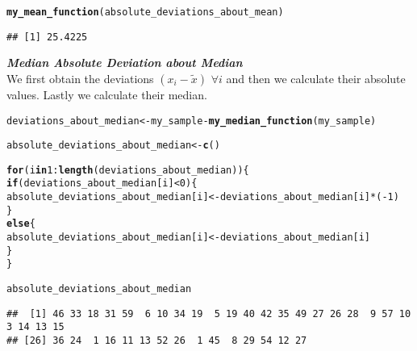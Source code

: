 \documentclass[11pt, a4paper]{article}\usepackage[]{graphicx}\usepackage[]{xcolor}
\makeatletter
\newcommand{\hlnum}[1]{\textcolor[rgb]{0.686,0.059,0.569}{#1}}%
\newcommand{\hlopt}[1]{\textcolor[rgb]{0,0,0}{#1}}%
\newcommand{\hldef}[1]{\textcolor[rgb]{0.345,0.345,0.345}{#1}}%
\newcommand{\hlkwa}[1]{\textcolor[rgb]{0.161,0.373,0.58}{\textbf{#1}}}%
\newcommand{\hlkwb}[1]{\textcolor[rgb]{0.69,0.353,0.396}{#1}}%
\newcommand{\hlkwd}[1]{\textcolor[rgb]{0.737,0.353,0.396}{\textbf{#1}}}%
\newenvironment{kframe}{%
 \def\at@end@of@kframe{}%
 \ifinner\ifhmode%
  \def\at@end@of@kframe{\end{minipage}}%
  \begin{minipage}{\columnwidth}%
 \fi\fi%
 \def\FrameCommand##1{\hskip\@totalleftmargin \hskip-\fboxsep
 \colorbox{shadecolor}{##1}\hskip-\fboxsep
     \hskip-\linewidth \hskip-\@totalleftmargin \hskip\columnwidth}%
 \MakeFramed {\advance\hsize-\width
   \@totalleftmargin\z@ \linewidth\hsize
   \@setminipage}}%
 {\par\unskip\endMakeFramed%
 \at@end@of@kframe}
\newenvironment{knitrout}{}{} %
\makeatother
\begin{document}
\begin{knitrout}\footnotesize
{}\color{fgcolor}\begin{kframe}
\begin{alltt}
\hlkwd{my_mean_function}\hldef{(absolute_deviations_about_mean)}
\end{alltt}
\begin{verbatim}
## [1] 25.4225
\end{verbatim}
\end{kframe}
\end{knitrout}

\vspace{0.5cm}

\faArrowAltCircleRight[regular] \textit{\textbf{Median Absolute Deviation about Median}} \\

We first obtain the deviations $(x_i - \widetilde{x}) \,\, \forall i$ and then we calculate their absolute values. Lastly we calculate their median.

\begin{knitrout}\footnotesize
{}\color{fgcolor}\begin{kframe}
\begin{alltt}
\hldef{deviations_about_median} \hlkwb{<-} \hldef{my_sample} \hlopt{-} \hlkwd{my_median_function}\hldef{(my_sample)}

\hldef{absolute_deviations_about_median} \hlkwb{<-} \hlkwd{c}\hldef{()}

\hlkwa{for} \hldef{(i} \hlkwa{in} \hlnum{1}\hlopt{:}\hlkwd{length}\hldef{(deviations_about_median)) \{}
  \hlkwa{if}\hldef{(deviations_about_median[i]} \hlopt{<} \hlnum{0}\hldef{)\{}
    \hldef{absolute_deviations_about_median[i]} \hlkwb{<-} \hldef{deviations_about_median[i]} \hlopt{*} \hldef{(}\hlopt{-}\hlnum{1}\hldef{)}
  \hldef{\}}
  \hlkwa{else}\hldef{\{}
    \hldef{absolute_deviations_about_median[i]} \hlkwb{<-} \hldef{deviations_about_median[i]}
  \hldef{\}}
\hldef{\}}
\end{alltt}
\end{kframe}
\end{knitrout}

\begin{knitrout}\footnotesize
{}\color{fgcolor}\begin{kframe}
\begin{alltt}
\hldef{absolute_deviations_about_median}
\end{alltt}
\begin{verbatim}
##  [1] 46 33 18 31 59  6 10 34 19  5 19 40 42 35 49 27 26 28  9 57 10  3 14 13 15
## [26] 36 24  1 16 11 13 52 26  1 45  8 29 54 12 27
\end{verbatim}
\end{kframe}
\end{knitrout}
\end{document}
